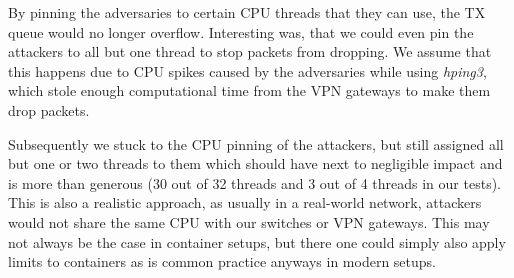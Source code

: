 By pinning the adversaries to certain CPU threads that they can use, the TX queue would no longer overflow. Interesting was, that we could even pin the attackers to all but one thread to stop packets from dropping. We assume that this happens due to CPU spikes caused by the adversaries while using \textit{hping3}, which stole enough computational time from the VPN gateways to make them drop packets.

Subsequently we stuck to the CPU pinning of the attackers, but still assigned all but one or two threads to them which should have next to negligible impact and is more than generous (30 out of 32 threads and 3 out of 4 threads in our tests). This is also a realistic approach, as usually in a real-world network, attackers would not share the same CPU with our switches or VPN gateways. This may not always be the case in container setups, but there one could simply also apply limits to containers as is common practice anyways in modern setups.
